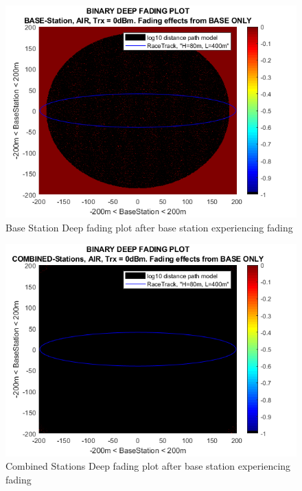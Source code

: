 \begin{figure}[H]
	\centering
	\includegraphics[width=\linewidth]{theory/fading/fig/binaryDeepFading_baseStation_baseOnly.png}
	\caption{Base Station Deep fading plot after base station experiencing fading}
	\label{fig:binaryDeepFading_baseStation_baseOnly}
\end{figure}

\begin{figure}[H]
	\centering
	\includegraphics[width=\linewidth]{theory/fading/fig/binaryDeepFading_combinedStations_baseOnly.png}
	\caption{Combined Stations Deep fading plot after base station experiencing fading}
	\label{fig:binaryDeepFading_combinedStations_baseOnly}
\end{figure}

